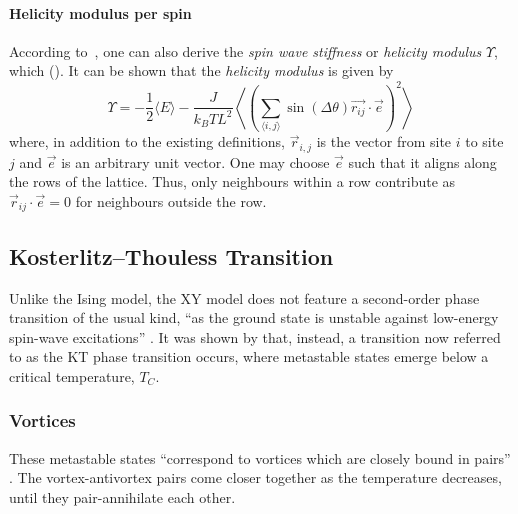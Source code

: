 		\paragraph{Helicity modulus per spin}
			According to~\cite{teitel_helicity}, one can also derive the \emph{spin wave stiffness} or \emph{helicity modulus} $\Upsilon$, which  (\cite{teitel_helicity}). It can be shown that the \emph{helicity modulus} is given by
			\begin{equation}\label{eq:helicity_modulus}
				\Upsilon = -\frac{1}{2} \langle E \rangle - \frac{J}{k_B T L^2} \left\langle \left(\sum_{\langle i,j \rangle}{\sin(\Delta \theta) \vec{r_{ij}} \cdot \vec{e}}\right)^2 \right\rangle
			\end{equation}
			\cite[eq. 3.2]{teitel_helicity} where, in addition to the existing definitions, $\vec{r}_{i,j}$ is the vector from site $i$ to site $j$ and $\vec{e}$ is an arbitrary unit vector. One may choose $\vec{e}$ such that it aligns along the rows of the lattice. Thus, only neighbours within a row contribute as $\vec{r}_{ij} \cdot \vec{e} = 0$ for neighbours outside the row.
	
	\subsection{Kosterlitz–Thouless Transition}
		Unlike the Ising model, the XY model does not feature a second-order phase transition of the usual kind, \enquote{as the ground state is unstable against low-energy spin-wave excitations} \cite[p. 1190]{kosterlitz}. It was shown by \cite{kosterlitz} that, instead, a transition now referred to as the KT phase transition occurs, where metastable states emerge below a critical temperature, $T_C$.
	
		\subsubsection{Vortices}
			These metastable states \enquote{correspond to vortices which are closely bound in pairs} \cite[p. 1190]{kosterlitz}. The vortex-antivortex pairs come closer together as the temperature decreases, until they pair-annihilate each other.